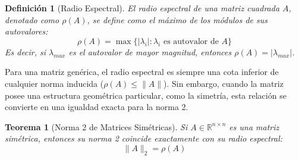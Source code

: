 \documentclass[12pt]{article}
\newtheorem{teorema}{Teorema}
\newtheorem{definicion}{Definición}
\begin{document}
\begin{definicion}[Radio Espectral]
El radio espectral de una matriz cuadrada $A$, denotado como $\rho(A)$, se define como el máximo de los módulos de sus autovalores:
\begin{equation}
    \rho(A) = \max \{|\lambda_i| : \lambda_i \text{ es autovalor de } A\}
\end{equation}
Es decir, si $\lambda_{max}$ es el autovalor de mayor magnitud, entonces $\rho(A) = |\lambda_{max}|$.
\end{definicion}

Para una matriz genérica, el radio espectral es siempre una cota inferior de cualquier norma inducida ($\rho(A) \le \|A\|$). Sin embargo, cuando la matriz posee una estructura geométrica particular, como la simetría, esta relación se convierte en una igualdad exacta para la norma 2.

\begin{teorema}[Norma 2 de Matrices Simétricas]
Si $A \in \mathbb{R}^{n \times n}$ es una matriz simétrica, entonces su norma 2 coincide exactamente con su radio espectral:
\begin{equation}
    \|A\|_2 = \rho(A)
\end{equation}
\end{teorema}
\end{document}
